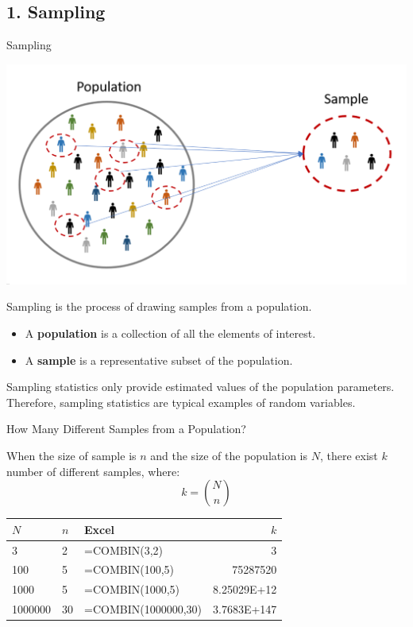 \documentclass{beamer}
\begin{document}
\subsection{1. Sampling}


\begin{frame}
\subsectionpage
\end{frame}

\begin{frame}{Sampling}

\begin{center}
\includegraphics[scale=0.1]{images/section5PopulationSample.png}
\end{center}

Sampling is the process of drawing samples from a population.
\begin{itemize}
\item A \textbf{population} is a collection of all the elements of interest.
\item A \textbf{sample} is a representative subset of the population.
\end{itemize}
Sampling statistics only provide estimated values of the population parameters. Therefore, sampling statistics are typical examples of random variables. 

\end{frame}



\begin{frame}{How Many Different Samples from a Population?}

When the size of sample is $n$ and the size of the population is $N$, there exist $k$ number of different samples, where: 
$$k = {N \choose n}$$


\begin{center}
\begin{tabular}{l|l|l|r}
\hline
$N$     & $n$ & Excel          & $k$         \\ \hline \hline
3       & 2   & =COMBIN(3,2) & 3           \\ \hline
100     & 5   & =COMBIN(100,5) & 75287520    \\ \hline
1000    & 5   & =COMBIN(1000,5) & 8.25029E+12 \\ \hline
1000000 & 30  & =COMBIN(1000000,30) & 3.7683E+147 \\ \hline
\end{tabular}

\end{center}

\end{frame}
\end{document}
